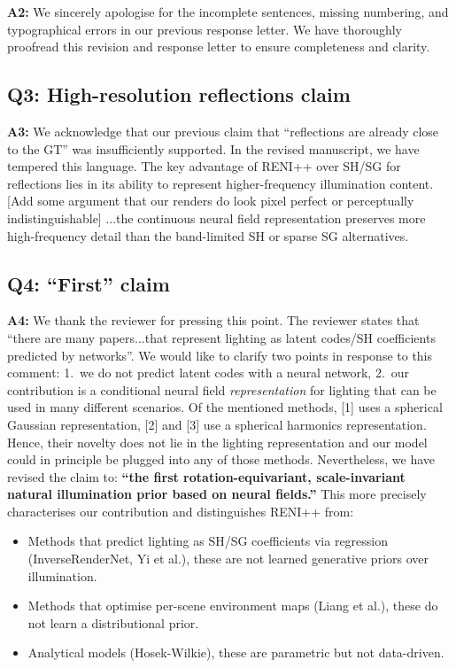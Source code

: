 \documentclass[11pt]{article}
\newcommand{\question}[1]{\subsection*{Q#1}}
\newcommand{\answer}[1]{\textbf{A#1:}}
\begin{document}
\answer{2} We sincerely apologise for the incomplete sentences, missing numbering, and typographical errors in our previous response letter. We have thoroughly proofread this revision and response letter to ensure completeness and clarity.

\question{3: High-resolution reflections claim}

\answer{3} We acknowledge that our previous claim that ``reflections are already close to the GT'' was insufficiently supported. In the revised manuscript, we have tempered this language. The key advantage of RENI++ over SH/SG for reflections lies in its ability to represent higher-frequency illumination content. [Add some argument that our renders do look pixel perfect or perceptually indistinguishable] ...the continuous neural field representation preserves more high-frequency detail than the band-limited SH or sparse SG alternatives.

\question{4: ``First'' claim}

\answer{4} We thank the reviewer for pressing this point. The reviewer states that ``there are many papers...that represent lighting as latent codes/SH coefficients predicted by networks''. We would like to clarify two points in response to this comment: 1.~we do not predict latent codes with a neural network, 2.~our contribution is a conditional neural field \emph{representation} for lighting that can be used in many different scenarios. Of the mentioned methods, [1] uses a spherical Gaussian representation, [2] and [3] use a spherical harmonics representation. Hence, their novelty does not lie in the lighting representation and our model could in principle be plugged into any of those methods. Nevertheless, we have revised the claim to: \textbf{``the first rotation-equivariant, scale-invariant natural illumination prior based on neural fields.''} This more precisely characterises our contribution and distinguishes RENI++ from:
\begin{itemize}
    \item Methods that predict lighting as SH/SG coefficients via regression (InverseRenderNet, Yi et al.), these are not learned generative priors over illumination.
    \item Methods that optimise per-scene environment maps (Liang et al.), these do not learn a distributional prior.
    \item Analytical models (Hosek-Wilkie), these are parametric but not data-driven.
\end{itemize}
\end{document}
